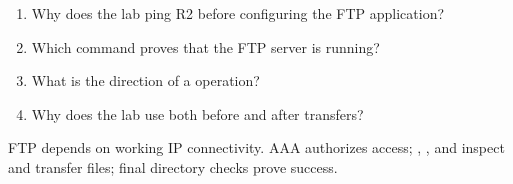 \begin{quickcheck}
\begin{enumerate}
\item Why does the lab ping R2 before configuring the FTP application?
\item Which command proves that the FTP server is running?
\item What is the direction of a  operation?
\item Why does the lab use  both before and after transfers?
\end{enumerate}
\end{quickcheck}

\begin{chapterrecap}
FTP depends on working IP connectivity. AAA authorizes access; , , and  inspect and transfer files; final directory checks prove success.
\end{chapterrecap}


